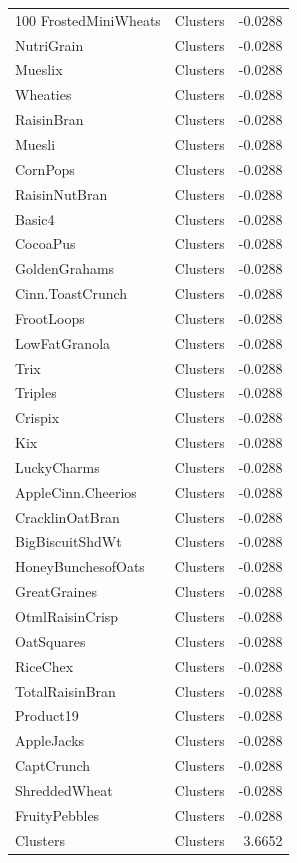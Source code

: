 \begin{longtable}{llr}
100%
FrostedMiniWheats & Clusters & -0.0288 \\
NutriGrain & Clusters & -0.0288 \\
Mueslix & Clusters & -0.0288 \\
Wheaties & Clusters & -0.0288 \\
RaisinBran & Clusters & -0.0288 \\
Muesli & Clusters & -0.0288 \\
CornPops & Clusters & -0.0288 \\
RaisinNutBran & Clusters & -0.0288 \\
Basic4 & Clusters & -0.0288 \\
CocoaPus & Clusters & -0.0288 \\
GoldenGrahams & Clusters & -0.0288 \\
Cinn.ToastCrunch & Clusters & -0.0288 \\
FrootLoops & Clusters & -0.0288 \\
LowFatGranola & Clusters & -0.0288 \\
Trix & Clusters & -0.0288 \\
Triples & Clusters & -0.0288 \\
Crispix & Clusters & -0.0288 \\
Kix & Clusters & -0.0288 \\
LuckyCharms & Clusters & -0.0288 \\
AppleCinn.Cheerios & Clusters & -0.0288 \\
CracklinOatBran & Clusters & -0.0288 \\
BigBiscuitShdWt & Clusters & -0.0288 \\
HoneyBunchesofOats & Clusters & -0.0288 \\
GreatGraines & Clusters & -0.0288 \\
OtmlRaisinCrisp & Clusters & -0.0288 \\
OatSquares & Clusters & -0.0288 \\
RiceChex & Clusters & -0.0288 \\
TotalRaisinBran & Clusters & -0.0288 \\
Product19 & Clusters & -0.0288 \\
AppleJacks & Clusters & -0.0288 \\
CaptCrunch & Clusters & -0.0288 \\
ShreddedWheat & Clusters & -0.0288 \\
FruityPebbles & Clusters & -0.0288 \\
Clusters & Clusters & 3.6652 \\

\end{longtable}
